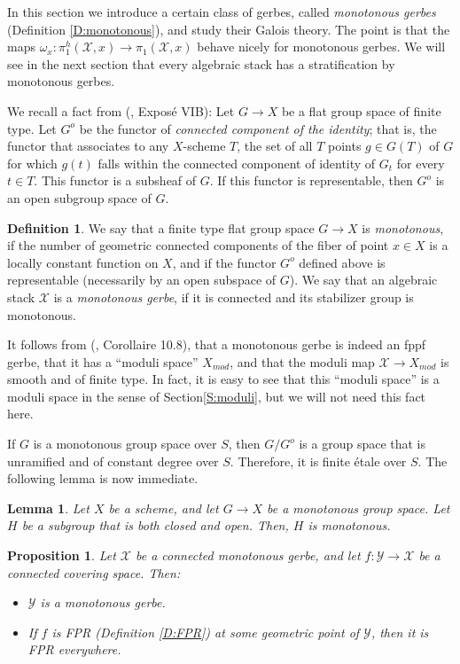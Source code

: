 \documentclass{amsart}
\newtheorem{lem}[thm]{Lemma}
\newtheorem{prop}[thm]{Proposition}
\theoremstyle{definition}
\newtheorem{defn}[thm]{Definition}
\theoremstyle{remark}
\theoremstyle{remark}
\newcommand{\X}{\mathcal{X}}
\newcommand{\Y}{\mathcal{Y}}
\newcommand{\Xm}{X_{mod}}
\newcommand{\ox}{\omega_x}
\newcommand{\pX}{\pi_1(\X,x)}
\newcommand{\phX}{\pi_1^{h}(\X,x)}
\let\:=\colon
\begin{document}
 In this section we introduce a certain class of gerbes, called
 {\em monotonous gerbes} (Definition \ref{D:monotonous}), and
 study their Galois theory. The point is that the maps $\ox \:
 \phX \to \pX$ behave nicely for monotonous gerbes. We will see in
 the next section that every algebraic stack has a stratification
 by monotonous gerbes.

 We recall a fact from (\cite{SGA3}, Expos\'{e} VIB): Let $G \to
 X$ be a flat group space  of finite type. Let $G^o$ be the
 functor of {\it connected component of the identity}; that is,
 the functor that associates to any $X$-scheme $T$, the set of all
 $T$ points  $g \in G(T)$ of $G$ for which $g(t)$ falls within the
 connected component of identity of $G_t$ for every $t \in T$.
 This functor is a subsheaf of $G$. If this functor is
 representable, then $G^o$ is an open subgroup space of $G$.

 \begin{defn}{\label{D:monotonous}}
 We say that a finite type flat group space $ G \to X$ is
 {\em monotonous}, if the number of geometric connected components
 of the fiber of point $x \in X$ is a locally constant
 function on $X$, and if the functor $G^o$ defined above is representable
 (necessarily by an open subspace
 of $G$).  We say that an algebraic stack $\X$ is a {\sl monotonous gerbe},
 if it is connected and its stabilizer group is  monotonous.
 \end{defn}

It follows from (\cite{LM}, Corollaire 10.8), that a monotonous
gerbe is indeed an fppf gerbe, that it has a ``moduli space''
$\Xm$, and that the moduli map $\X \to \Xm$ is smooth and of
finite type. In fact, it is easy to see that this ``moduli space''
is a moduli space in the sense of Section\ref{S:moduli}, but we
will not need this fact here.

 If $G$ is a monotonous group space over $S$, then $G/G^o$ is a
 group space that is unramified and of constant degree over $S$.
 Therefore, it is  finite \'{e}tale over $S$. The following lemma
 is now immediate.

 \begin{lem}{\label{L:comp}}
 Let $X$ be a scheme, and let $G \to X$ be a  monotonous group space. Let $H$ be a subgroup
 that is both closed and open. Then, $H$ is monotonous.
 \end{lem}


 \begin{prop}{\label{P:cover}}
 Let $\X$ be a connected
 monotonous gerbe, and let $f \: \Y \to \X$ be a connected covering space. Then:
 \begin{itemize}
 \item[$\mathbf{i}$)] $\Y$ is a monotonous gerbe.
 \item[$\mathbf{ii}$)] If  $f$ is FPR (Definition \ref{D:FPR}) at some geometric point of $\Y$,
 then it is FPR everywhere.
 \end{itemize}
 \end{prop}
\end{document}
